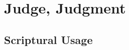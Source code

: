 \section{Judge, Judgment}
	\label{JUDGE}
	





\subsection{Scriptural Usage} %
	\label{JUDGE-SCRIPTURES}

	
	

